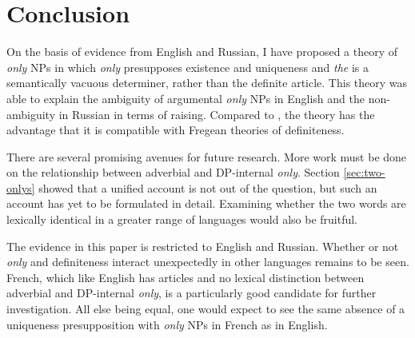 \section{Conclusion \label{sec:conclusion}}
On the basis of evidence from English and Russian, I have proposed a theory of \textit{only} NPs in which \textit{only} presupposes existence and uniqueness and \textit{the} is a semantically vacuous determiner, rather than the definite article. This theory was able to explain the ambiguity of argumental \textit{only} NPs in English and the non-ambiguity in Russian in terms of raising. Compared to \citet{cb2015}, the theory has the advantage that it is compatible with Fregean theories of definiteness.

There are several promising avenues for future research. More work must be done on the relationship between adverbial and DP-internal \textit{only}. Section \ref{sec:two-onlys} showed that a unified account is not out of the question, but such an account has yet to be formulated in detail. Examining whether the two words are lexically identical in a greater range of languages would also be fruitful.

The evidence in this paper is restricted to English and Russian. Whether or not \textit{only} and definiteness interact unexpectedly in other languages remains to be seen. French, which like English has articles and no lexical distinction between adverbial and DP-internal \textit{only}, is a particularly good candidate for further investigation. All else being equal, one would expect to see the same absence of a uniqueness presupposition with \textit{only} NPs in French as in English.